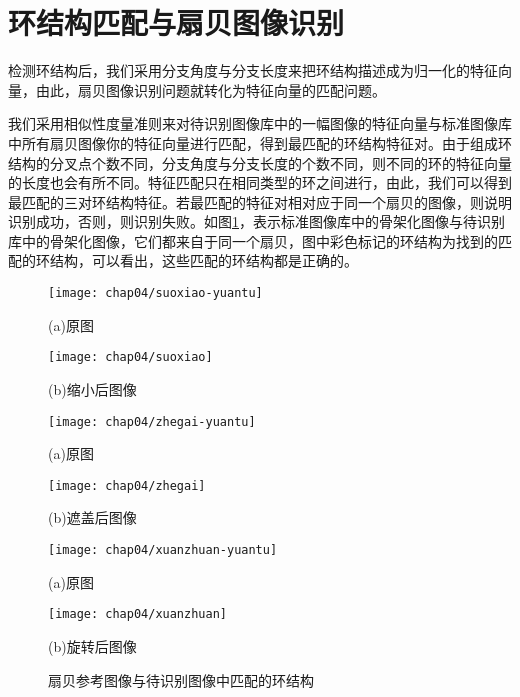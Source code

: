 \section{环结构匹配与扇贝图像识别}
\label{}

检测环结构后，我们采用分支角度与分支长度来把环结构描述成为归一化的特征向量，由此，扇贝图像识别问题就转化为特征向量的匹配问题。

我们采用相似性度量准则来对待识别图像库中的一幅图像的特征向量与标准图像库中所有扇贝图像你的特征向量进行匹配，得到最匹配的环结构特征对。由于组成环结构的分叉点个数不同，分支角度与分支长度的个数不同，则不同的环的特征向量的长度也会有所不同。特征匹配只在相同类型的环之间进行，由此，我们可以得到最匹配的三对环结构特征。若最匹配的特征对相对应于同一个扇贝的图像，则说明识别成功，否则，则识别失败。如图\ref{fig:recognition}，表示标准图像库中的骨架化图像与待识别库中的骨架化图像，它们都来自于同一个扇贝，图中彩色标记的环结构为找到的匹配的环结构，可以看出，这些匹配的环结构都是正确的。

\begin{figure}
\centering
  \begin{minipage}[b]{0.48\textwidth} 
      \centering 
      \texttt{[image: chap04/suoxiao-yuantu]}
        \centerline{(a)原图}\medskip
    \end{minipage}
  \begin{minipage}[b]{0.48\textwidth}
    \centering
    \texttt{[image: chap04/suoxiao]}
      \centerline{(b)缩小后图像}\medskip
    \end{minipage}
  \begin{minipage}[b]{0.48\textwidth} 
      \centering 
      \texttt{[image: chap04/zhegai-yuantu]}
        \centerline{(a)原图}\medskip
    \end{minipage}
  \begin{minipage}[b]{0.48\textwidth}
    \centering
    \texttt{[image: chap04/zhegai]}
      \centerline{(b)遮盖后图像}\medskip
    \end{minipage}
  \begin{minipage}[b]{0.48\textwidth} 
      \centering 
      \texttt{[image: chap04/xuanzhuan-yuantu]}
        \centerline{(a)原图}\medskip
    \end{minipage}
  \begin{minipage}[b]{0.48\textwidth}
    \centering
    \texttt{[image: chap04/xuanzhuan]}
      \centerline{(b)旋转后图像}\medskip
    \end{minipage}
\caption{扇贝参考图像与待识别图像中匹配的环结构}
\label{fig:recognition}
\end{figure}

